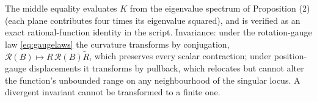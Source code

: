 The middle equality evaluates $K$ from the eigenvalue spectrum of Proposition (2) (each plane contributes four times its eigenvalue squared), and is verified as an exact rational-function identity in the script. Invariance: under the rotation-gauge law \eqref{eq:gaugelaws} the curvature transforms by conjugation, $\mathcal{R}(B) \mapsto R\,\mathcal{R}(B)\tilde R$, which preserves every scalar contraction; under position-gauge displacements it transforms by pullback, which relocates but cannot alter the function's unbounded range on any neighbourhood of the singular locus. A divergent invariant cannot be transformed to a finite one.

